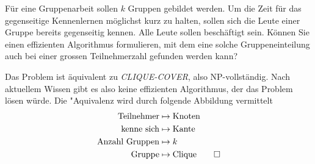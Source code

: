 Für eine Gruppenarbeit sollen $k$ Gruppen gebildet werden.
Um die Zeit für das gegenseitige Kennenlernen möglichst
kurz zu halten, sollen sich die Leute einer Gruppe bereits
gegenseitig kennen. Alle Leute sollen beschäftigt sein.
Können Sie einen effizienten Algorithmus
formulieren, mit dem eine solche Gruppeneinteilung auch bei
einer grossen Teilnehmerzahl gefunden werden kann?

\begin{loesung}
Das Problem ist äquivalent zu \textsl{CLIQUE-COVER}, also
NP-vollständig. Nach aktuellem Wissen gibt es also keine
effizienten Algorithmus, der das Problem lösen würde. Die
"Aquivalenz wird durch folgende Abbildung vermittelt
\begin{align*}
\text{Teilnehmer}&\mapsto\text{Knoten}\\
\text{kenne sich}&\mapsto\text{Kante}\\
\text{Anzahl Gruppen}&\mapsto k\\
\text{Gruppe}&\mapsto\text{Clique}
\qedhere
\end{align*}
\end{loesung}
